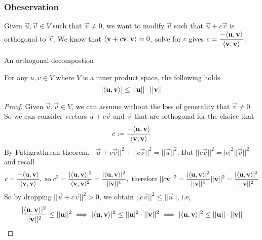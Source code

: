 \subsubsection*{Obeservation}
Given $\vec u,\vec v \in V$ such that $\vec v \neq 0$, we want to modify $\vec u$ such that $\vec u + c\vec v$ is orthogonal to $\vec v$. We know that $\langle \mathbf v + c\mathbf v, \mathbf v \rangle = 0$, solve for $c$ gives $c = \displaystyle\frac{-\langle \mathbf u, \mathbf v\rangle}{\langle \mathbf v, \mathbf v \rangle}$.
\begin{center}

    An orthogonal decompostion
\end{center}
\begin{theorem}
    For any $u,v \in V$ where $V$ is a inner product space, the following holds
    \[ |\langle \mathbf u,\mathbf v \rangle| \leq ||\mathbf u|| \cdot ||\mathbf v||\]
\end{theorem}
\begin{proof}
    Given $\vec u,\vec v \in V$, we can assume without the loss of generality that $\vec v \neq 0$. So we can consider vectors $\vec u + c\vec v$ and $\vec v$ that are orthogonal for the choice that 
    \[ c: = \frac{ - \langle \mathbf u,\mathbf v \rangle}{\langle \mathbf v,\mathbf v\rangle}\]
    By Pathgrathrean theorem, $||\vec u + c\vec v||^2 + ||c\vec v||^2 = ||\vec u||^2$. But $||c\vec v||^2 = |c|^2||\vec v||^2$ and recall \[ c= \frac{- \langle \mathbf u,\mathbf v\rangle}{\langle \mathbf v,\mathbf v\rangle}, \text{ so } c^2= \frac{|\langle \mathbf u, \mathbf v\rangle|^2}{\langle \mathbf v,\mathbf v\rangle^2} = \frac{|\langle \mathbf u, \mathbf v \rangle|^2}{||\mathbf v||^4}, \text{ therefore } ||c\mathbf v||^2 = \frac{|\langle \mathbf u, \mathbf v \rangle|^2}{||\mathbf v||^4} ||\mathbf v||^2 = \frac{|\langle \mathbf u, \mathbf v \rangle|^2}{||\mathbf v||^2}\]
    So by dropping $||\vec u + c\vec v||^2 > 0$, we obtain $||c\vec v||^2 \leq ||\vec u||$, i.e, 
    \[ \frac{|\langle \mathbf u, \mathbf v \rangle|^2}{||\mathbf v||^2} \leq ||\mathbf u||^2 \implies |\langle \mathbf  u,\mathbf v\rangle|^2 \leq ||\mathbf u|^2 \cdot ||\mathbf v||^2 \implies |\langle \mathbf u,\mathbf v \rangle|^2 \leq ||\mathbf u|| \cdot ||\mathbf v||\]
\end{proof}

